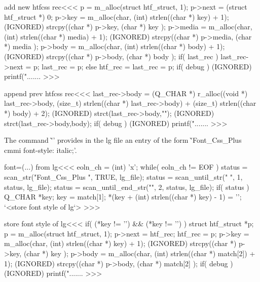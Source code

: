 {\<add new htfcss rec\><<<
p = m_alloc(struct htf_struct, 1);
p->next =  (struct htf_struct *) 0;
p->key =   m_alloc(char, (int) strlen((char *) key) + 1);
(IGNORED) strcpy((char *)  p->key, (char *) key );
p->media =   m_alloc(char, (int) strlen((char *) media) + 1);
(IGNORED) strcpy((char *)  p->media, (char *) media );
p->body =   m_alloc(char, (int) strlen((char *) body) + 1);
(IGNORED) strcpy((char *)  p->body, (char *) body );
if( last_rec ){
   last_rec->next = p;  last_rec = p;
} else {
   htf_rec = last_rec = p;
}
if( debug ){
   (IGNORED) printf(".......%
}
>>>

\<append prev htfcss rec\><<<
last_rec->body = (Q_CHAR *)  r_alloc((void *) last_rec->body,
      (size_t) strlen((char *) last_rec->body) 
    + (size_t) strlen((char *) body) 
    + 2);
(IGNORED) strct(last_rec->body,"\n");
(IGNORED) strct(last_rec->body,body);
if( debug ){
   (IGNORED) printf(".......%
}
>>>




The command \`''
provides in the lg file an entry of the form 
\`'Font_Css_Plus cmmi font-style: italic;'.

\<font=(...) from lg\><<<
eoln_ch = (int) 'x';
while( eoln_ch != EOF ) {              
   status = scan_str("Font_Css_Plus ", TRUE, lg_file);
   status = scan_until_str(" ", 1, status, lg_file);
   status = scan_until_end_str("", 2, status, lg_file);
   if( status ){                          Q_CHAR *key;
      key = match[1];  
      *(key + (int) strlen((char *) key) - 1) = '\0';
      `<store font style of lg`>
} } 
>>>



\<store font style of lg\><<<
if( (*key != '\0') && (*key != '\n') ) { 
                            struct htf_struct *p;    
   p = m_alloc(struct htf_struct, 1);
   p->next =  htf_rec;  
   htf_rec = p;
   p->key =   m_alloc(char, (int) strlen((char *) key) + 1);
   (IGNORED) strcpy((char *)  p->key, (char *) key );
   p->body =   m_alloc(char, (int) strlen((char *) match[2]) + 1);
   (IGNORED) strcpy((char *)  p->body, (char *) match[2] );
   if( debug ){
      (IGNORED) printf(".......%
} }
>>>










}
